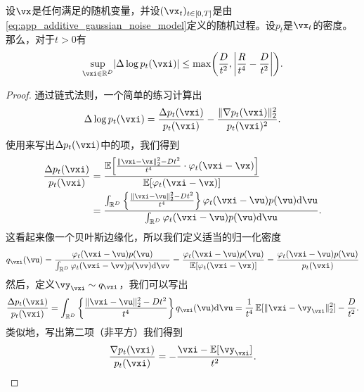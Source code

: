 \documentclass[../../book-main_zh.tex]{subfiles}
\begin{document}
\begin{lemma}\label{lem:app_diffusion_laplacian_control}
    设\(\vx\)是任何满足的随机变量，并设\((\vx_{t})_{t \in [0, T]}\)是由\eqref{eq:app_additive_gaussian_noise_model}定义的随机过程。设\(p_{t}\)是\(\vx_{t}\)的密度。那么，对于\(t > 0\)有
    \begin{equation}
        \sup_{\vxi \in \R^{D}}\abs{\Delta \log p_{t}(\vxi)} \leq \max\rp{\frac{D}{t^{2}}, \abs*{\frac{R}{t^{4}} - \frac{D}{t^{2}}}}.
    \end{equation}
\end{lemma}
\begin{proof}
    通过链式法则，一个简单的练习计算出
    \begin{equation}
        \Delta \log p_{t}(\vxi) = \frac{\Delta p_{t}(\vxi)}{p_{t}(\vxi)} - \frac{\norm{\nabla p_{t}(\vxi)}_{2}^{2}}{p_{t}(\vxi)^{2}}.
    \end{equation}
    使用来写出\(\Delta p_{t}(\vxi)\)中的项，我们得到
    \begin{align}
        \frac{\Delta p_{t}(\vxi)}{p_{t}(\vxi)}
        &= \frac{\Ex\rs{\frac{\norm{\vxi - \vx}_{2}^{2} - Dt^{2}}{t^{4}} \cdot \phi_{t}(\vxi - \vx)}}{\Ex[\phi_{t}(\vxi - \vx)]} \\
        &= \frac{\int_{\R^{D}}\bc{\frac{\norm{\vxi - \vu}_{2}^{2} - Dt^{2}}{t^{4}}}\phi_{t}(\vxi - \vu)p(\vu)\odif{\vu}}{\int_{\R^{D}}\phi_{t}(\vxi - \vu)p(\vu)\odif{\vu}}.
    \end{align}
    这看起来像一个贝叶斯边缘化，所以我们定义适当的归一化密度
    \begin{equation}
        q_{\vxi}(\vu) = \frac{\phi_{t}(\vxi - \vu)p(\vu)}{\int_{\R^{D}}\phi_{t}(\vxi - \vv)p(\vv)\odif{\vv}} = \frac{\phi_{t}(\vxi - \vu)p(\vu)}{\Ex[\phi_{t}(\vxi - \vx)]} = \frac{\phi_{t}(\vxi - \vu)p(\vu)}{p_{t}(\vxi)}
    \end{equation}
    然后，定义\(\vy_{\vxi} \sim q_{\vxi}\)，我们可以写出
    \begin{equation}
        \frac{\Delta p_{t}(\vxi)}{p_{t}(\vxi)} = \int_{\R^{D}}\bc{\frac{\norm{\vxi - \vu}_{2}^{2} - Dt^{2}}{t^{4}}}q_{\vxi}(\vu)\odif{\vu} = \frac{1}{t^{4}}\Ex[\norm{\vxi - \vy_{\vxi}}_{2}^{2}] - \frac{D}{t^{2}}.
    \end{equation}
    类似地，写出第二项（非平方）我们得到
    \begin{equation}
        \frac{\nabla p_{t}(\vxi)}{p_{t}(\vxi)} = -\frac{\vxi - \Ex[\vy_{\vxi}]}{t^{2}}.
    \end{equation}

\end{proof}
\end{document}
